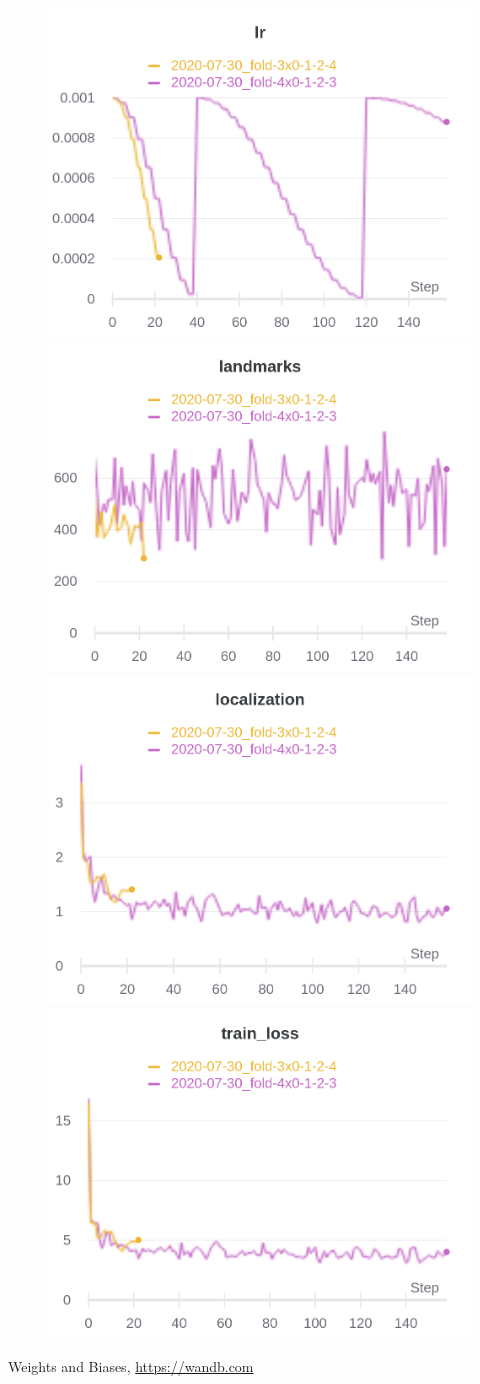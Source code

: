\documentclass{article}
\begin{document}
\begin{figure}[ht]
\includegraphics[width=0.5\linewidth]{charts/Section-1-Panel-4-ehikobml2}
\includegraphics[width=0.5\linewidth]{charts/Section-1-Panel-5-l0gagff82}
\includegraphics[width=0.5\linewidth]{charts/Section-1-Panel-6-0bcodqffw}
\includegraphics[width=0.5\linewidth]{charts/Section-1-Panel-7-se7ngykl9}
\end{figure}
\begin{thebibliography}{9}
  Weights and Biases,
  \href{https://app.wandb.ai/beefmilf/wheatDet-retinaface/reports/Untitled-Report--VmlldzoxOTI5NzI}{https://wandb.com}
\end{thebibliography}
\end{document}
